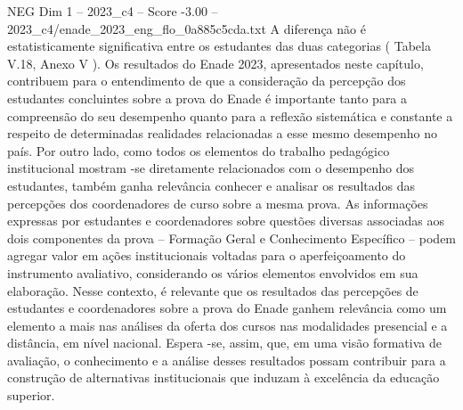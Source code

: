\begin{textsample}{NEG Dim 1 – 2023\_c4 – Score -3.00 – 2023\_c4/enade\_2023\_eng\_flo\_0a885c5cda.txt}
A diferença não é estatisticamente significativa entre os estudantes das duas categorias ( Tabela V.18, Anexo V ).
Os resultados do Enade 2023, apresentados neste capítulo, contribuem para o entendimento de que a consideração da percepção dos estudantes concluintes sobre a prova do Enade é importante tanto para a compreensão do seu desempenho quanto para a reflexão sistemática e constante a respeito de determinadas realidades relacionadas a esse mesmo desempenho no país.
Por outro lado, como todos os elementos do trabalho pedagógico institucional mostram -se diretamente relacionados com o desempenho dos estudantes, também ganha relevância conhecer e analisar os resultados das percepções dos coordenadores de curso sobre a mesma prova.
As informações expressas por estudantes e coordenadores sobre questões diversas associadas aos dois componentes da prova – Formação Geral e Conhecimento Específico – podem agregar valor em ações institucionais voltadas para o aperfeiçoamento do instrumento avaliativo, considerando os vários elementos envolvidos em sua elaboração.
Nesse contexto, é relevante que os resultados das percepções de estudantes e coordenadores sobre a prova do Enade ganhem relevância como um elemento a mais nas análises da oferta dos cursos nas modalidades presencial e a distância, em nível nacional.
Espera -se, assim, que, em uma visão formativa de avaliação, o conhecimento e a análise desses resultados possam contribuir para a construção de alternativas institucionais que induzam à excelência da educação superior.

\end{textsample}
